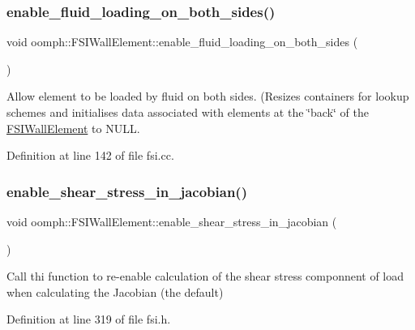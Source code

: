 \subsubsection{\texorpdfstring{enable\+\_\+fluid\+\_\+loading\+\_\+on\+\_\+both\+\_\+sides()}{enable\_fluid\_loading\_on\_both\_sides()}}
{\footnotesize\ttfamily void oomph\+::\+F\+S\+I\+Wall\+Element\+::enable\+\_\+fluid\+\_\+loading\+\_\+on\+\_\+both\+\_\+sides (\begin{DoxyParamCaption}{ }\end{DoxyParamCaption})}



Allow element to be loaded by fluid on both sides. (Resizes containers for lookup schemes and initialises data associated with elements at the \char`\"{}back\char`\"{} of the \hyperlink{classoomph_1_1FSIWallElement}{F\+S\+I\+Wall\+Element} to N\+U\+LL. 



Definition at line 142 of file fsi.\+cc.

\mbox{\label{classoomph_1_1FSIWallElement_a84dc551f32dcecb5166c8b0c51727b77}} 
\subsubsection{\texorpdfstring{enable\+\_\+shear\+\_\+stress\+\_\+in\+\_\+jacobian()}{enable\_shear\_stress\_in\_jacobian()}}
{\footnotesize\ttfamily void oomph\+::\+F\+S\+I\+Wall\+Element\+::enable\+\_\+shear\+\_\+stress\+\_\+in\+\_\+jacobian (\begin{DoxyParamCaption}{ }\end{DoxyParamCaption})\hspace{0.3cm}{\ttfamily [inline]}}

Call thi function to re-\/enable calculation of the shear stress componnent of load when calculating the Jacobian (the default) 

Definition at line 319 of file fsi.\+h.

\mbox{\label{classoomph_1_1FSIWallElement_a872cb60fecdd19234a37be9f98546365}} 
